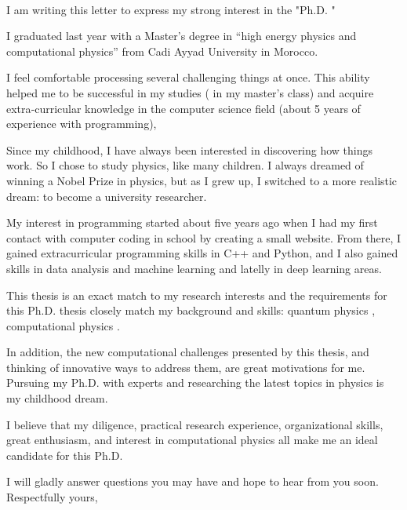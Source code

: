 \documentclass[11pt, a4paper]{awesome-cv}
\begin{document}
	
	\makecvheader[C]
	
	
 	\makelettertitle
	
	
	
	
	\begin{cvletter}
\dearauthor \\
I am writing this letter to express my strong interest in the "Ph.D. \thesis"
		
		
%		
% 
% 
% 

I graduated last year with a Master’s degree in “high energy physics and computational physics” from Cadi Ayyad University in Morocco.

I feel comfortable processing several challenging things at once. This ability helped me to be successful in my studies (    in my master's class) and acquire extra‐curricular knowledge in the computer science field (about 5 years of experience with programming),


Since my childhood, I have always been interested in discovering how things work. So I chose to study physics, like many children. I always dreamed of winning a Nobel Prize in physics, but as I grew up, I switched to a more realistic dream: to become a university researcher.

My interest in programming started about five years ago when I had my first contact with computer coding in school by creating a small website. From there, I gained extracurricular programming skills in C++ and Python, and I also gained skills in data analysis and machine learning and latelly in deep learning areas.

This thesis is an exact match to my research interests and the requirements for this Ph.D. thesis closely match my background and skills: quantum physics , computational physics .

In addition, the new computational challenges presented by this thesis, and thinking of innovative ways to address them, are great motivations for me. Pursuing my Ph.D. with experts and researching the latest topics in physics is my childhood dream.

I believe that my diligence, practical research experience, organizational skills, great enthusiasm, and interest in computational physics all make me an ideal candidate for this Ph.D.

\vspace{1ex}
I will gladly answer questions you may have and hope to hear from you soon.\\
Respectfully yours,\\
	\end{cvletter}
	
	

	
\end{document}
